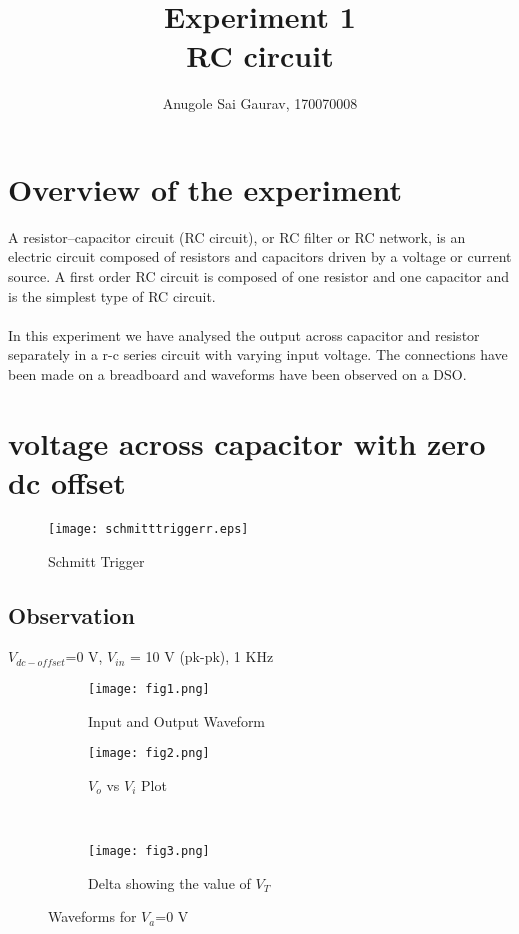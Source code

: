 \documentclass[12pt]{article}
\title{Experiment 1\\
RC circuit}
\author{Anugole Sai Gaurav, 170070008}
\date
\begin{document}
\maketitle

\section{Overview of the experiment}
A resistor–capacitor circuit (RC circuit), or RC filter or RC network, is an electric circuit composed of resistors and capacitors driven by a voltage or current source. A first order RC circuit is composed of one resistor and one capacitor and is the simplest type of RC circuit.
\\
\\In this experiment we have analysed the output across capacitor and resistor separately in a r-c series circuit with varying input voltage. The connections have been made on a breadboard and waveforms have been observed on a DSO.


\section{voltage across capacitor with zero dc offset}

\begin{figure}[h]
\centering
\texttt{[image: schmitttriggerr.eps]}
\caption{Schmitt Trigger}
\end{figure}

\subsection{Observation}
$V_{dc-offset}$=0 V,  $V_{in}$ = 10 V (pk-pk), 1 KHz 

\begin{figure}[h]
\centering
\begin{subfigure}{.5\textwidth}
  \centering
  \texttt{[image: fig1.png]}
  \caption{Input and Output Waveform}
  \label{fig:sub1}
\end{subfigure}%
\begin{subfigure}{.5\textwidth}
  \centering
  \texttt{[image: fig2.png]}
  \caption{$V_{o}$ vs $V_{i}$ Plot}
  \end{subfigure}%
\\
\begin{subfigure}{.5\textwidth}
  \centering
  \texttt{[image: fig3.png]}
  \caption{Delta showing the value of $V_{T}$}
  \label{fig:sub2}
\end{subfigure}
\caption{Waveforms for $V_{a}$=0 V}
\end{figure}
\end{document}
